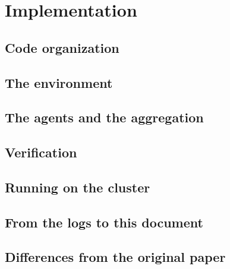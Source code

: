 \chapter{Implementation}

\section{Code organization}

\section{The environment}

\section{The agents and the aggregation}

\section{Verification}

\section{Running on the cluster}

\section{From the logs to this document}

\section{Differences from the original paper}
\label{sec:impl-differences}
